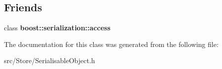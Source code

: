 \subsection*{Friends}
\begin{DoxyCompactItemize}
\item 
\hypertarget{classSerialisableObject_ac98d07dd8f7b70e16ccb9a01abf56b9c}{class {\bfseries boost\-::serialization\-::access}}\label{classSerialisableObject_ac98d07dd8f7b70e16ccb9a01abf56b9c}

\end{DoxyCompactItemize}


The documentation for this class was generated from the following file\-:\begin{DoxyCompactItemize}
\item 
src/\-Store/Serialisable\-Object.\-h\end{DoxyCompactItemize}
